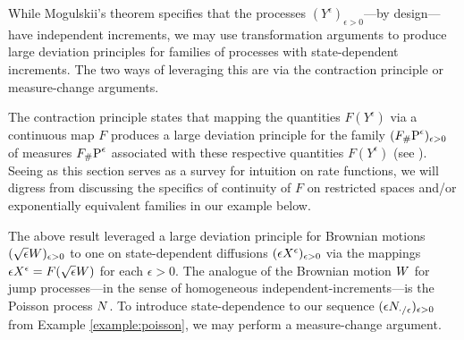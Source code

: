 While Mogulskii's theorem specifies that the processes $(Y^\epsilon)_{\epsilon>0}$---by design---have independent increments, we may use transformation arguments to produce large deviation principles for families of processes with state-dependent increments.
The two ways of leveraging this are via the contraction principle or measure-change arguments.

The contraction principle states that mapping the quantities $F(Y^\epsilon)$ via a continuous map $F$ produces a large deviation principle for the family $(\push{\Prb^\epsilon}{F})_{\epsilon>0}$ of measures $\push{\Prb^\epsilon}{F}$ associated with these respective quantities $F(Y^\epsilon)$ (see \cite[Theorem 4.2.1]{dembo2010}).
Seeing as this section serves as a survey for intuition on rate functions, we will digress from discussing the specifics of continuity of $F$ on restricted spaces and/or exponentially equivalent families in our example below.



The above result leveraged a large deviation principle for Brownian motions $(\sqrt\epsilon\W)_{\epsilon>0}$ to one on state-dependent diffusions $(\Xe)_{\epsilon>0}$ via the mappings $\Xe = F(\sqrt\epsilon\W)$ for each $\epsilon > 0$.
The analogue of the Brownian motion $\W$ for jump processes---in the sense of homogeneous independent-increments---is the Poisson process $\N$.
To introduce state-dependence to our sequence $(\epsilon\N_{\cdot/\epsilon})_{\epsilon>0}$ from Example \ref{example:poisson}, we may perform a measure-change argument.


